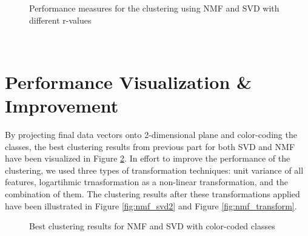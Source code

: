 \documentclass{article}
\begin{document}
\begin{figure}[!ht]
		\qquad
		\vspace*{-3mm}
	\caption{Performance measures for the clustering using NMF and SVD with different r-values}
	\label{fig:performance_measures}
\end{figure}

\\ 


\section{Performance Visualization \& Improvement}

By projecting final data vectors onto 2-dimensional plane and color-coding the classes, the best clustering results from previous part for both SVD and NMF have been visualized in Figure \ref{fig:nmf_svd1}. In effort to improve the performance of the clustering, we used three types of transformation techniques: unit variance of all features, logartihmic trnasformation as a non-linear transformation, and the combination of them. The clustering results after these transformations applied have been illustrated in Figure \ref{fig:nmf_svd2} and Figure \ref{fig:nmf_transform}.  




\begin{figure}[!ht]%
	\centering
		\qquad
		\vspace*{-3mm}
	\caption{Best clustering results for NMF and SVD with color-coded classes}
	\label{fig:nmf_svd1}
\end{figure}
\end{document}
